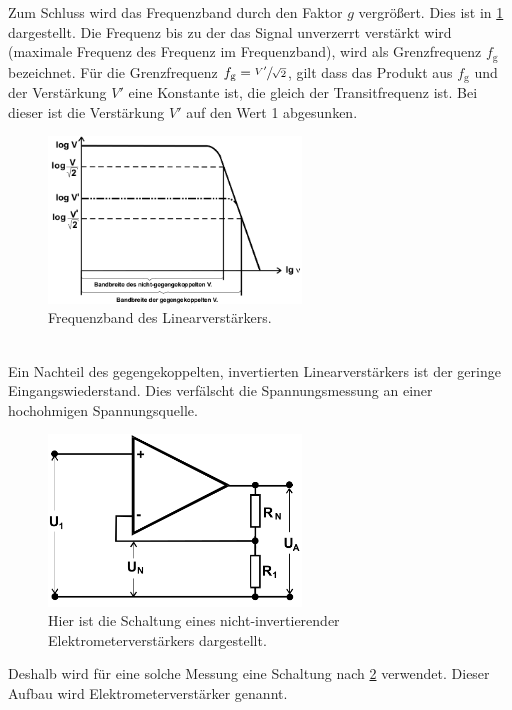 Zum Schluss wird das Frequenzband durch den Faktor $g$ vergrößert.
Dies ist in \cref{fig:Frequenzgang} dargestellt. Die Frequenz bis zu der das Signal unverzerrt verstärkt 
wird (maximale Frequenz des Frequenz im Frequenzband), wird als Grenzfrequenz $f_{\mathrm{g}}$ bezeichnet. 
Für die Grenzfrequenz $f_{\mathrm{g}} = \sfrac{V'}{\sqrt{2}}$, gilt dass das Produkt aus $f_{\mathrm{g}}$ und der Verstärkung $V'$ eine Konstante ist, die gleich der Transitfrequenz ist.
Bei dieser ist die Verstärkung $V'$ auf den Wert 1 abgesunken.
\begin{figure}[h!]
	\centering
	\includegraphics[width = 0.6\textwidth]{../Grafiken/Frequenz_Liniearverstaerker.png}
	\caption{Frequenzband des Linearverstärkers. \cite{V51}\label{fig:Frequenzgang}}
\end{figure}\\
\indent
Ein Nachteil des gegengekoppelten, invertierten Linearverstärkers ist der geringe Eingangswiederstand.
Dies verfälscht die Spannungsmessung an einer hochohmigen Spannungsquelle.
\begin{figure}[h!]
	\centering
	\includegraphics[width = 0.6\textwidth]{../Grafiken/nicht_invertierter_Linearverstaerker.png}
	\caption{Hier ist die Schaltung eines nicht-invertierender Elektrometerverstärkers dargestellt. \cite{V51}\label{fig:Elektrometerverstärker}}
\end{figure}
Deshalb wird für eine solche Messung eine Schaltung nach \cref{fig:Elektrometerverstärker} verwendet.
Dieser Aufbau wird Elektrometerverstärker genannt.
